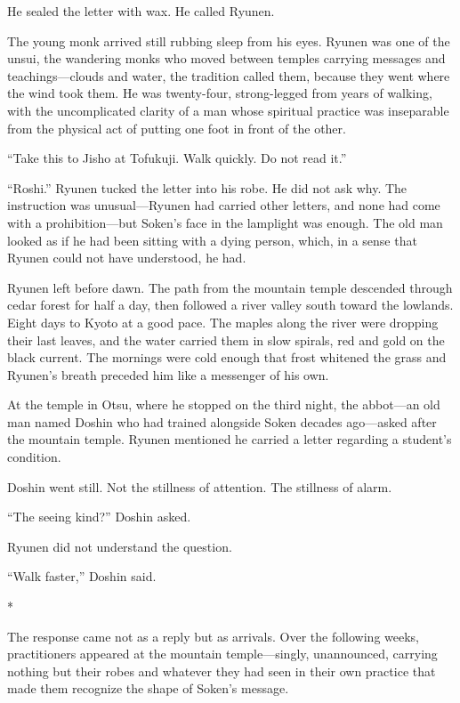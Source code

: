 He sealed the letter with wax. He called Ryunen.

The young monk arrived still rubbing sleep from his eyes. Ryunen was one of the unsui, the wandering monks who moved between temples carrying messages and teachings---clouds and water, the tradition called them, because they went where the wind took them. He was twenty-four, strong-legged from years of walking, with the uncomplicated clarity of a man whose spiritual practice was inseparable from the physical act of putting one foot in front of the other.

``Take this to Jisho at Tofukuji. Walk quickly. Do not read it.''

``Roshi.'' Ryunen tucked the letter into his robe. He did not ask why. The instruction was unusual---Ryunen had carried other letters, and none had come with a prohibition---but Soken's face in the lamplight was enough. The old man looked as if he had been sitting with a dying person, which, in a sense that Ryunen could not have understood, he had.

Ryunen left before dawn. The path from the mountain temple descended through cedar forest for half a day, then followed a river valley south toward the lowlands. Eight days to Kyoto at a good pace. The maples along the river were dropping their last leaves, and the water carried them in slow spirals, red and gold on the black current. The mornings were cold enough that frost whitened the grass and Ryunen's breath preceded him like a messenger of his own.

At the temple in Otsu, where he stopped on the third night, the abbot---an old man named Doshin who had trained alongside Soken decades ago---asked after the mountain temple. Ryunen mentioned he carried a letter regarding a student's condition.

Doshin went still. Not the stillness of attention. The stillness of alarm.

``The seeing kind?'' Doshin asked.

Ryunen did not understand the question.

``Walk faster,'' Doshin said.

\begin{center}
*\quad*\quad*
\end{center}

The response came not as a reply but as arrivals. Over the following weeks, practitioners appeared at the mountain temple---singly, unannounced, carrying nothing but their robes and whatever they had seen in their own practice that made them recognize the shape of Soken's message.

